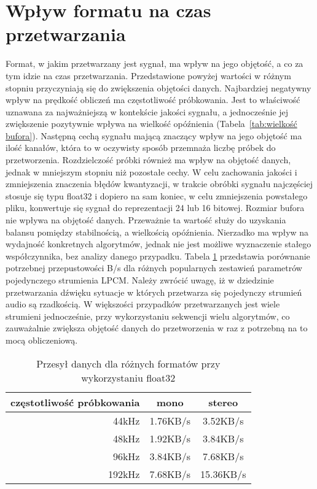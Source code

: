 \section{Wpływ formatu na czas przetwarzania}
Format, w jakim przetwarzany jest sygnał, ma wpływ na jego objętość, a co za tym idzie na czas przetwarzania. Przedstawione powyżej wartości w różnym stopniu przyczyniają się do zwiększenia objętości danych. Najbardziej negatywny wpływ na prędkość obliczeń ma częstotliwość próbkowania. Jest to właściwość uznawana za najważniejszą w kontekście jakości sygnału, a jednocześnie jej zwiększenie pozytywnie wpływa na wielkość opóźnienia (Tabela~\ref{tab:wielkość bufora}). Następną cechą sygnału mającą znaczący wpływ na jego objętość ma ilość kanałów, która to w oczywisty sposób przemnaża liczbę próbek do przetworzenia. Rozdzielczość próbki również ma wpływ na objętość danych, jednak w mniejszym stopniu niż pozostałe cechy. W celu zachowania jakości i zmniejszenia znaczenia błędów kwantyzacji, w trakcie obróbki sygnału najczęściej stosuje się typu float32 i dopiero na sam koniec, w celu zmniejszenia powstałego pliku, konwertuje się sygnał do reprezentacji 24 lub 16 bitowej. Rozmiar bufora nie wpływa na objętość danych. Przeważnie ta wartość służy do uzyskania balansu pomiędzy stabilnością, a wielkością opóźnienia. Nierzadko ma wpływ na wydajność konkretnych algorytmów, jednak nie jest możliwe wyznaczenie stałego współczynnika, bez analizy danego przypadku. Tabela \ref{tab:Przesył danych dla różnych formatów przy wykorzystaniu float32} przedstawia porównanie potrzebnej przepustowości B/s dla różnych popularnych zestawień parametrów pojedynczego strumienia LPCM. Należy zwrócić uwagę, iż w dziedzinie przetwarzania dźwięku sytuacje w których przetwarza się pojedynczy strumień audio są rzadkością. W większości przypadków przetwarzanych jest wiele strumieni jednocześnie, przy wykorzystaniu sekwencji wielu algorytmów, co zauważalnie zwiększa objętość danych do przetworzenia w raz z potrzebną na to mocą obliczeniową. 

\begin{table}[t]
    \begin{center}
        \caption{Przesył danych dla różnych formatów przy wykorzystaniu float32}
        \label{tab:Przesył danych dla różnych formatów przy wykorzystaniu float32}
        \begin{tabular}{r|c|c}
            częstotliwość próbkowania  &   mono  &   stereo \\
            \hline
            44kHz                      &   1.76KB/s &  3.52KB/s  \\
            48kHz                      &   1.92KB/s &  3.84KB/s  \\
            96kHz                      &   3.84KB/s &  7.68KB/s  \\
            192kHz                     &   7.68KB/s & 15.36KB/s  \\
        \end{tabular}
    \end{center}
\end{table}

